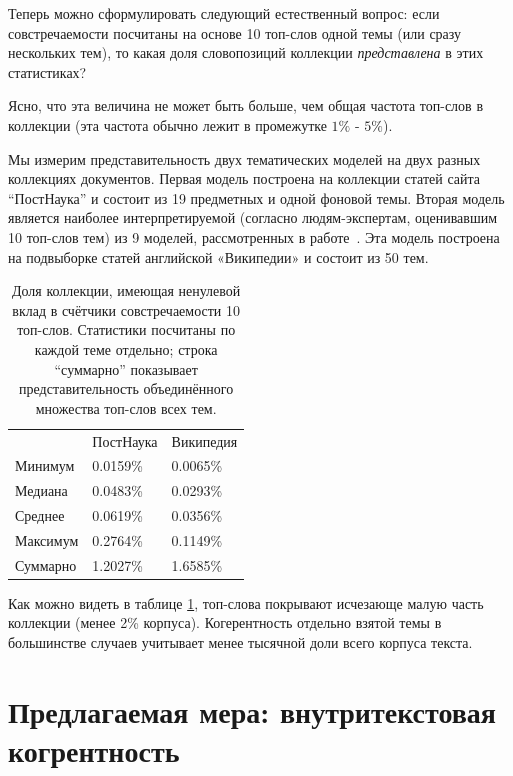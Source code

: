 Теперь можно сформулировать следующий естественный вопрос: если совстречаемости посчитаны на основе 10 топ-слов одной темы (или сразу нескольких тем), то какая доля словопозиций коллекции \textit{представлена} в этих статистиках?

Ясно, что эта величина не может быть больше, чем общая частота топ-слов в коллекции (эта частота обычно лежит в промежутке $1\%$ - $5\%$).


Мы измерим представительность двух тематических моделей на двух разных коллекциях документов. Первая модель построена на коллекции статей сайта ``ПостНаука'' и состоит из 19 предметных и одной фоновой темы. Вторая модель является наиболее интерпретируемой (согласно людям-экспертам, оценивавшим 10 топ-слов тем) из 9 моделей, рассмотренных в работе~\cite{rtl}. Эта модель построена на подвыборке статей английской «Википедии» и состоит из 50 тем.

\begin{table}[ht]
\begin{tabular}{lll}
         & ПостНаука & Википедия \\
Минимум  & 0.0159\%  & 0.0065\%  \\
Медиана  & 0.0483\%  & 0.0293\%  \\
Среднее  & 0.0619\%  & 0.0356\%  \\
Максимум & 0.2764\%  & 0.1149\%  \\
Суммарно & 1.2027\%  & 1.6585\%
\end{tabular}
    \caption{
      Доля коллекции, имеющая ненулевой вклад в счётчики совстречаемости 10 топ-слов. Статистики посчитаны по каждой теме отдельно; строка ``суммарно'' показывает представительность объединённого множества топ-слов всех тем.
    }
    \label{table:represented}
\end{table}

Как можно видеть в таблице \ref{table:represented}, топ-слова покрывают исчезающе малую часть коллекции (менее 2\% корпуса). Когерентность отдельно взятой темы в большинстве случаев учитывает менее тысячной доли всего корпуса текста.


\section{Предлагаемая мера: внутритекстовая когрентность}

